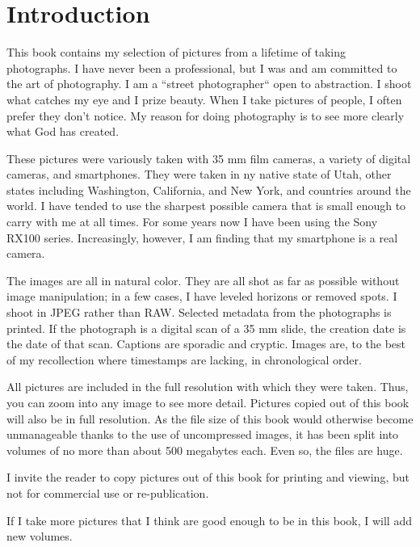 \chapter{Introduction}

This book contains my selection of pictures from a lifetime of taking photographs. I have never been a professional, but I was and am committed to the art of photography. I am a ``street photographer`` open to abstraction. I shoot what catches my eye and I prize beauty. When I take pictures of people, I often prefer they don't notice. My reason for doing photography is to see more clearly what God has created.

These pictures were variously taken with 35 mm film cameras, a variety of digital cameras, and smartphones. They were taken in ny native state of Utah, other states including Washington, California, and New York, and countries around the world. I have tended to use the sharpest possible camera that is small enough to carry with me at all times. For some years now I have been using the Sony RX100 series. Increasingly, however, I am finding that my smartphone is a real camera.

The images are all in natural color. They are all shot as far as possible without image manipulation; in a few cases, I have leveled horizons or removed spots. I shoot in JPEG rather than RAW. Selected metadata from the photographs is printed. If the photograph is a digital scan of a 35 mm slide, the creation date is the date of that scan. Captions are sporadic and cryptic. Images are, to the best of my recollection where timestamps are lacking, in chronological order.

All pictures are included in the full resolution with which they were taken. Thus, you can zoom into any image to see more detail. Pictures copied out of this book will also be in full resolution. As the file size of this book would otherwise become unmanageable thanks to the use of uncompressed images, it has been split into volumes of no more than about 500 megabytes each. Even so, the files are huge.

I invite the reader to copy pictures out of this book for printing and viewing, but not for commercial use or re-publication. 

If I take more pictures that I think are good enough to be in this book, I will add new volumes.
